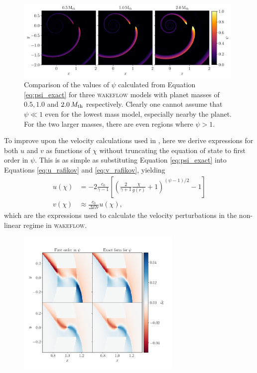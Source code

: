 \begin{figure}
    \centering
    \includegraphics[width = 0.98\textwidth]{figures/psi 2.pdf}
    \caption{Comparison of the values of $\psi$ calculated from Equation \ref{eq:psi_exact} for three \textsc{wakeflow} models with planet masses of $0.5, 1.0$ and $2.0 \, M_{\rm{th}}$ respectively. Clearly one cannot assume that $\psi \ll 1$ even for the lowest mass model, especially nearby the planet. For the two larger masses, there are even regions where $\psi > 1$.}
    \label{fig:psi_comparison}
\end{figure}

To improve upon the velocity calculations used in \citet{bollati2021}, here we derive expressions for both $u$ and $v$ as functions of $\chi$ without truncating the equation of state to first order in $\psi$. This is as simple as substituting Equation \ref{eq:psi_exact} into Equations \ref{eq:u_rafikov} and \ref{eq:v_rafikov}, yielding
\begin{align}
    u(\chi) &= -2 \frac{c_0}{\gamma - 1} \left[ \left( \frac{2}{\gamma + 1} \frac{\chi}{g(r)} +1  \right)^{(\psi-1)/2} -1 \right] \\
    v(\chi) &\approx \frac{c_0}{\Delta\Omega r} u (\chi),
\end{align}
which are the expressions used to calculate the velocity perturbations in the non-linear regime in \textsc{wakeflow}. 

\begin{figure}
    \centering
    \includegraphics[width = 0.7\textwidth]{figures/0_5_mth.pdf}
    \caption{}
    \label{fig:0_5mth}
\end{figure}

